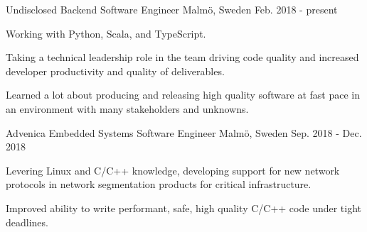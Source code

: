 


\begin{cventries}


\cventry
{Undisclosed} %
{Backend Software Engineer} %
{Malmö, Sweden} %
{Feb. 2018 - present} %
{ %
\begin{cvitems}
\item {Working with Python, Scala, and TypeScript.}
\item {Taking a technical leadership role in the team driving code quality
       and increased developer productivity and quality of deliverables.}
\item {Learned a lot about producing and releasing high quality
       software at fast pace in an environment with many stakeholders and
       unknowns.}
\end{cvitems}
}


\cventry
{Advenica} %
{Embedded Systems Software Engineer} %
{Malmö, Sweden} %
{Sep. 2018 - Dec. 2018} %
{ %
\begin{cvitems}
\item {
Levering Linux and C/C++ knowledge, developing support for new network
protocols in network segmentation products for critical infrastructure.}
\item {
Improved ability to write performant, safe, high quality C/C++ code under tight
deadlines.}
\end{cvitems}
}

\end{cventries}
